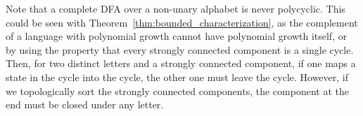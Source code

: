 \begin{toappendix}
Note that a complete DFA over a non-unary alphabet is never polycyclic.
This could be seen with Theorem~\ref{thm:bounded_characterization},
as the complement of a language with polynomial growth cannot have polynomial growth
itself, or by using the property that every strongly connected
component is a single cycle. %
Then, for two distinct letters and a strongly connected component, if one maps a state in the cycle into the cycle, the other one must leave the cycle. However, if we topologically sort
the strongly connected components, the component at the end must be closed
under any letter.
\end{toappendix}



\begin{comment}
\begin{toappendix}
\subsection{Strictly Bounded and Commutative Languages}


Let $\Sigma = \{a_1, \ldots, a_k\}$
be an alphabet of size $k$
and $\psi : \Sigma^* \to \mathbb N_0^k$
be the \emph{Parikh morphism}
given by $\psi(w) = (|w|_{a_1}, \ldots, |w|_{a_k})$
for $w \in \Sigma^*$, where $|w|_{a_i}$, for $i \in \{1,\ldots,k\}$, counts the number of occurrences of the symbol $a_i$ in $w$.


\end{comment}
